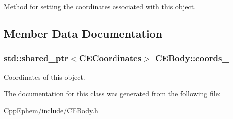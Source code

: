 Method for setting the coordinates associated with this object. 



\subsection{Member Data Documentation}
\hypertarget{class_c_e_body_ad054d987e2287cc5946fda179dc2dea4}{}
\subsubsection[{coords\+\_\+}]{\setlength{\rightskip}{0pt plus 5cm}std\+::shared\+\_\+ptr$<${\bf C\+E\+Coordinates}$>$ C\+E\+Body\+::coords\+\_\+\hspace{0.3cm}{\ttfamily [protected]}}\label{class_c_e_body_ad054d987e2287cc5946fda179dc2dea4}


Coordinates of this object. 



The documentation for this class was generated from the following file\+:\begin{DoxyCompactItemize}
\item 
Cpp\+Ephem/include/\hyperlink{_c_e_body_8h}{C\+E\+Body.\+h}\end{DoxyCompactItemize}
